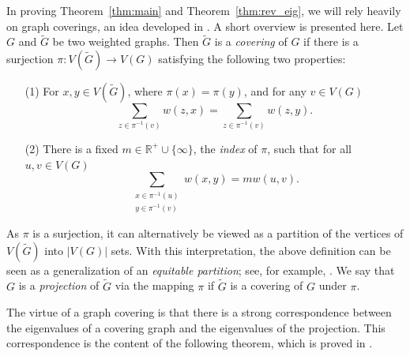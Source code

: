 
In proving Theorem~\ref{thm:main} and Theorem~\ref{thm:rev_eig}, we will rely heavily on graph coverings, an idea developed in \cite{ChungYau1998}.  A short overview is presented here.  Let $G$ and $ \tilde{G}$ be two weighted graphs.  Then $\tilde{G}$ is a \textit{covering} of $G$ if there is a surjection $\pi : V(\tilde{G}) \to V(G)$ satisfying the following two properties:
\begin{itemize}
 \item[(1)] For $x,y \in V(\tilde{G})$, where $\pi(x) = \pi(y)$, and for any $v \in V(G)$
 \[ \displaystyle \sum_{z \in \pi^{-1}(v)} w(z,x) = \displaystyle \sum_{z \in \pi^{-1}(v)} w(z,y) . \]
 \item[(2)] There is a fixed $m \in \mathbb{R}^{+} \cup \{\infty\}$, the \textit{index} of $\pi$, such that for all $u,v \in V(G)$
 \begin{equation}\label{covering_sum_condition}
  \displaystyle \sum_{\substack{x \in \pi^{-1}(u) \\ y \in \pi^{-1}(v)}} w(x,y) = m w(u,v) .
 \end{equation}
\end{itemize}
As $\pi$ is a surjection, it can alternatively be viewed as a partition of the vertices of $V(\tilde{G})$ into $|V(G)|$ sets.  With this interpretation, the above definition can be seen as a generalization of an \textit{equitable partition}; see, for example, \cite{GodsilRoyle2013}.
We say that $G$ is a {\it projection} of $\tilde{G}$ via the mapping $\pi$ if $\tilde{G}$ is a covering of $G$ under $\pi$.


The virtue of a graph covering is that there is a strong correspondence between the eigenvalues of a covering graph and the eigenvalues of the projection.  This correspondence is the content of the following theorem, which is proved in \cite{ChungYau1998}.


